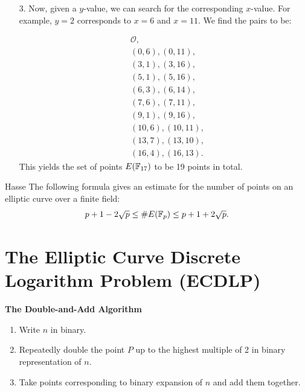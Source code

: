 {    \begin{enumerate}
        \item[3.] Now, given a \(y\)-value, we can search for the corresponding \(x\)-value. For example, \(y = 2\) corresponds to \(x = 6\) and \(x = 11\). We find the pairs to be:

              \[
                  \begin{aligned}
                       & \mathcal{O},       \\
                       & (0, 6), (0, 11),   \\
                       & (3, 1), (3, 16),   \\
                       & (5, 1), (5, 16),   \\
                       & (6, 3), (6, 14),   \\
                       & (7, 6), (7, 11),   \\
                       & (9, 1), (9, 16),   \\
                       & (10, 6), (10, 11), \\
                       & (13, 7), (13, 10), \\
                       & (16, 4), (16, 13).
                  \end{aligned}
              \]
              This yields the set of points \(E(\mathbb{F}_{17})\) to be 19 points in total.
    \end{enumerate}
}

\begin{theorem}
    {Hasse} The following formula gives an estimate for the number of points on an elliptic curve over a finite field:
    \[
        p + 1 - 2\sqrt{p} \le \#E(\mathbb{F}_{p}) \le p + 1 + 2\sqrt{p}.
    \]
\end{theorem}

\section{The Elliptic Curve Discrete Logarithm Problem (ECDLP)}


\begin{center}
\textbf{The Double-and-Add Algorithm}
\end{center}

\begin{enumerate}
    \item Write \(n\) in binary.
    \item Repeatedly double the point \(P\) up to the highest multiple of 2 in binary representation of \(n\).
    \item Take points corresponding to binary expansion of \(n\) and add them together.
\end{enumerate}


